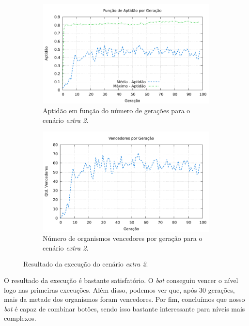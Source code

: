\begin{figure}[H]
\centering
	\begin{subfigure}[b]{0.4\textwidth}
        \includegraphics[width=\textwidth]{fig/extra2-fitness.pdf}
        \caption{Aptidão em função do número de gerações para o cenário
        \textit{extra 2}.}
	\end{subfigure}
	\begin{subfigure}[b]{0.4\textwidth}
        \includegraphics[width=\textwidth]{fig/extra2-winners.pdf}
        \caption{Número de organismos vencedores por geração para o cenário
        \textit{extra 2}.}
	\end{subfigure}

    \caption{Resultado da execução do cenário \textit{extra 2}.}
	\label{fig:extra2-results}
\end{figure}

O resultado da execução é bastante satisfatório. O \textit{bot} conseguiu
vencer o nível logo nas primeiras execuções. Além disso, podemos ver que, após
30 gerações, mais da metade dos organismos foram vencedores. Por fim,
concluímos que nosso \textit{bot} é capaz de combinar botões, sendo isso
bastante interessante para níveis mais complexos.  

